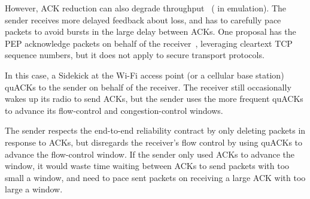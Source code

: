 However, ACK reduction can also degrade
throughput~\cite{custura2023reducing,custura2020impact}
( in emulation).
The sender receives more delayed feedback about loss, and has to carefully
pace packets to avoid bursts in the large delay between ACKs.
One proposal has the PEP acknowledge packets on behalf of the
receiver~\cite{kliazovich2012arqproxy}, leveraging cleartext TCP sequence
numbers, but it does not apply to secure transport protocols.

In this case, a Sidekick at the Wi-Fi access point (or a cellular base station)
quACKs to the sender on behalf of the receiver. The receiver still occasionally
wakes up its radio to send ACKs, but the sender uses the more frequent quACKs
to advance its flow-control and congestion-control windows.

The sender respects the end-to-end reliability contract by only deleting packets
in response to ACKs, but disregards the receiver's flow control by using quACKs
to advance the flow-control window. If the sender only used ACKs to advance the
window, it would waste time waiting between ACKs to send packets with too small
a window, and need to pace sent packets on receiving a large ACK with too large
a window.
